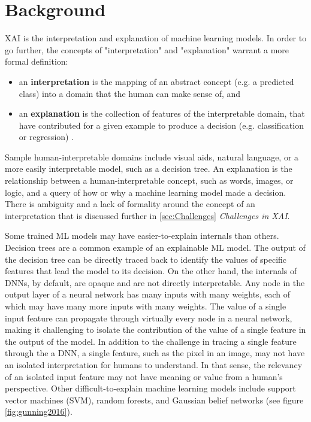 \section{Background}

XAI is the interpretation and explanation of machine learning models.  In order to go further, the concepts of "interpretation" and "explanation" warrant a more formal definition:

\begin{itemize}
    \item an \textbf{interpretation} is the mapping of an abstract concept (e.g. a predicted class) into a domain that the human can make sense of, and
    \item an \textbf{explanation} is the collection of features of the interpretable domain, that have contributed for a given example to produce a decision (e.g. classification or regression) \cite{MONTAVON20181}.
\end{itemize}

Sample human-interpretable domains include visual aids, natural language, or a more easily interpretable model, such as a decision tree.  An explanation is the relationship between a human-interpretable concept, such as words, images, or logic, and a query of how or why a machine learning model made a decision.  There is ambiguity and a lack of formality around the concept of an interpretation that is discussed further in \ref{sec:Challenges} \textit{Challenges in XAI}.

Some trained ML models may have easier-to-explain internals than others.  Decision trees are a common example of an explainable ML model.  The output of the decision tree can be directly traced back to identify the values of specific features that lead the model to its decision.  On the other hand, the internals of DNNs, by default, are opaque and are not directly interpretable.  Any node in the output layer of a neural network has many inputs with many weights, each of which may have many more inputs with many weights.  The value of a single input feature can propagate through virtually every node in a neural network, making it challenging to isolate the contribution of the value of a single feature in the output of the model.  In addition to the challenge in tracing a single feature through the a DNN, a single feature, such as the pixel in an image, may not have an isolated interpretation for humans to understand.  In that sense, the relevancy of an isolated input feature may not have meaning or value from a human's perspective.  Other difficult-to-explain machine learning models include support vector machines (SVM), random forests, and Gaussian belief networks (see figure \ref{fig:gunning2016}).

